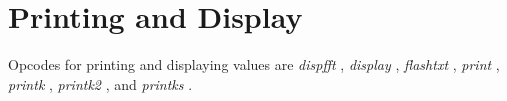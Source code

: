 \begin{comment}
\documentclass[10pt]{article}
\usepackage{fullpage, graphicx, url}
\setlength{\parskip}{1ex}
\setlength{\parindent}{0ex}
\title{Printing and Display}



\begin{tabular}{ccc}
The Alternative Csound Reference Manual & & \\
Previous &Signal Input and Output &Next

\end{tabular}

\end{comment}
\section{Printing and Display}


  Opcodes for printing and displaying values are \emph{dispfft}
, \emph{display}
, \emph{flashtxt}
, \emph{print}
, \emph{printk}
, \emph{printk2}
, and \emph{printks}
. 


\begin{comment}
\begin{tabular}{lcr}
Previous &Home &Next \\
Output &Up &Sound File Queries

\end{tabular}



\end{comment}
